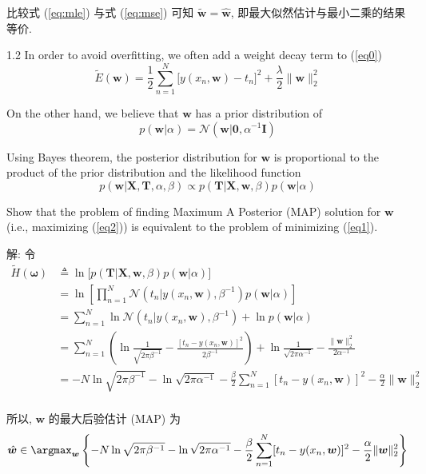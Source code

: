 \documentclass[openany]{ctexbook}
\theoremstyle{kaiti}
\theoremstyle{normal}
\begin{document}
比较式 (\ref{eq:mle}) 与式 (\ref{eq:mse}) 可知 $\tilde{\bm{w}}=\hat{\bm{w}}$, 即最大似然估计与最小二乘的结果等价.

1.2 In order to avoid overfitting, we often add a weight decay term to (\ref{eq0})
\begin{equation}
  \label{eq1}
  \tilde{E}(\bm{w})=\frac{1}{2}\sum_{n=1}^N\big[y(x_n,\bm{w})-t_n\big]^2
  +\frac{\lambda}{2} \|\bm{w}\|_2^2
\end{equation}

On the other hand, we believe that $\bm{w}$ has a prior distribution of 
\[
p(\bm{w} | \alpha) = \mathcal{N} (\bm{w} | \bm{0}, \alpha^{-1} \bm{I})
\]

Using Bayes theorem, the posterior distribution for $\bm{w}$ is proportional to the product of the prior distribution and the likelihood function
\begin{equation}
\label{eq2}
p(\bm{w} | \bm{X}, \bm{T}, \alpha, \beta) \propto 
p(\bm{T} | \bm{X}, \bm{w}, \beta) p(\bm{w} | \alpha)
\end{equation}

Show that the problem of finding Maximum A Posterior (MAP) solution for $\bm{w}$ (i.e., maximizing (\ref{eq2})) is equivalent to the problem of minimizing (\ref{eq1}).

解: 令
\begin{equation}
  \begin{aligned}
    \tilde{H}(\bm{\omega})
    &\triangleq\ln\big[p(\bm{T} | \bm{X}, \bm{w}, \beta) p(\bm{w}|\alpha)\big]\\
    &=\ln\left[\prod_{n=1}^N \mathcal{N}(t_n|y(x_n,\bm{w}),\beta^{-1})p(\bm{w}|\alpha)\right]\\
    &=\sum_{n=1}^N\ln\mathcal{N}(t_n|y(x_n,\bm{w}),\beta^{-1})+\ln p(\bm{w}|\alpha)\\
    &=\sum_{n=1}^N\left(\ln\frac{1}{\sqrt{2\pi\beta^{-1}}}-\frac{[t_n-y(x_n,\bm{w})]^2}{2\beta^{-1}}\right)+\ln\frac{1}{\sqrt{2\pi\alpha^{-1}}}-\frac{\|\bm{w}\|_2^2}{2\alpha^{-1}}\\
    &=-N\ln\sqrt{2\pi\beta^{-1}}-\ln\sqrt{2\pi\alpha^{-1}}-\frac{\beta}{2}\sum_{n=1}^N[t_n-y(x_n,\bm{w})]^2-\frac{\alpha}{2}\|\bm{w}\|_2^2\\
  \end{aligned}
\end{equation}

所以, $\bm{w}$ 的最大后验估计 (MAP) 为
\begin{equation}
  \hat{\bm{w}}\in\argmax_{\bm{w}}\left\{-N\ln\sqrt{2\pi\beta^{-1}}-\ln\sqrt{2\pi\alpha^{-1}}-\frac{\beta}{2}\sum_{n=1}^N[t_n-y(x_n,\bm{w})]^2-\frac{\alpha}{2}\|\bm{w}\|_2^2\right\}
\end{equation}
\end{document}
